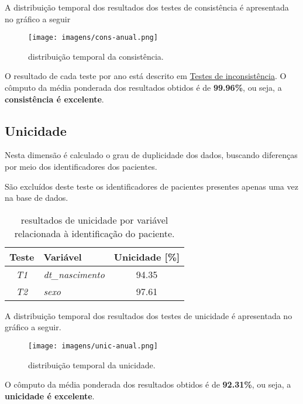 \documentclass[
  12,
  table]{proadi}
\begin{document}
A distribuição temporal dos resultados dos testes de consistência é
apresentada no gráfico a seguir

\begin{figure}
\centering
\texttt{[image: imagens/cons-anual.png]}
\caption{distribuição temporal da consistência.}
\end{figure}

O resultado de cada teste por ano está descrito em
\protect\hyperlink{testes-de-inconsistuxeancia}{Testes de
inconsistência}. O cômputo da média ponderada dos resultados obtidos é
de \textbf{99.96\%}, ou seja, a \textbf{consistência é excelente}.

\hypertarget{unicidade}{%
\subsection{Unicidade}\label{unicidade}}

\label{sub:unicidade}

Nesta dimensão é calculado o grau de duplicidade dos dados, buscando
diferenças por meio dos identificadores dos pacientes.

São excluídos deste teste os identificadores de pacientes presentes
apenas uma vez na base de dados.

\begin{table}[H]

\caption{\label{tab:unnamed-chunk-19}resultados de unicidade por variável relacionada à identificação do paciente.}
\centering
\fontsize{10}{12}\selectfont
\begin{tabular}[t]{>{}c>{}lc}
\toprule
Teste & Variável & Unicidade [\%]\\
\midrule
\em{T1} & \em{dt\_nascimento} & 94.35\\
\em{T2} & \em{sexo} & 97.61\\
\bottomrule
\end{tabular}
\end{table}

A distribuição temporal dos resultados dos testes de unicidade é
apresentada no gráfico a seguir.

\begin{figure}
\centering
\texttt{[image: imagens/unic-anual.png]}
\caption{distribuição temporal da unicidade.}
\end{figure}

O cômputo da média ponderada dos resultados obtidos é de
\textbf{92.31\%}, ou seja, a \textbf{unicidade é excelente}.
\end{document}
